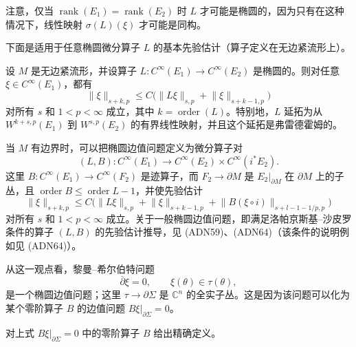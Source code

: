 注意，仅当 $\operatorname{rank}(E_1)=\operatorname{rank}(E_2)$ 时 $L$ 才可能是椭圆的，因为只有在这种情况下，线性映射 $\sigma(L)(\xi)$ 才可能是同构。

下面是适用于任意椭圆微分算子 $L$ 的基本先验估计（算子定义在无边紧流形上）。

\begin{proposition}\label{prop:elliptic-a-priori-estimate-fredholm}
设 $M$ 是无边紧流形，并设算子
$L:C^\infty(E_1)\to C^\infty(E_2)$ 是椭圆的。则对任意
$\xi\in C^\infty(E_1)$，都有
\[
 \lVert\xi\rVert_{s+k,p}\leq
 C\bigl(\lVert L\xi\rVert_{s,p}+\lVert\xi\rVert_{s+k-1,p}\bigr)
\]
对所有 $s$ 和 $1<p<\infty$ 成立，其中 $k=\operatorname{order}(L)$。特别地，$L$ 延拓为从 $W^{k+s,p}(E_1)$ 到 $W^{s,p}(E_2)$ 的有界线性映射，并且这个延拓是弗雷德霍姆的。
\end{proposition}

\begin{remark}\label{rem:elliptic-boundary-value-problem}
当 $M$ 有边界时，可以把椭圆边值问题定义为微分算子对
\[
 (L,B):C^\infty(E_1)\longrightarrow
 C^\infty(E_2)\times C^\infty(i^*E_2).
\]
这里 $B:C^\infty(E_1)\to C^\infty(F_2)$ 是迹算子，而
$F_2\to\partial M$ 是 $E_2|_{\partial M}$ 在 $\partial M$ 上的子丛，且
$\operatorname{order}B\leq\operatorname{order}L-1$，并使先验估计
\[
 \lVert\xi\rVert_{s+k,p}\leq C\bigl(
 \lVert L\xi\rVert_{s,p}+\lVert\xi\rVert_{s+k-1,p}
 +\lVert B(\xi\circ i)\rVert_{s+l-1-1/p,p}\bigr)
\]
对所有 $s$ 和 $1<p<\infty$ 成立。关于一般椭圆边值问题，即满足洛帕京斯基--沙皮罗条件的算子 $(L,B)$ 的先验估计推导，见 (ADN59)、(ADN64)（该条件的说明例如见 (ADN64)）。

从这一观点看，黎曼--希尔伯特问题
\[
 \overline\partial\xi=0,
 \qquad \xi(\theta)\in\tau(\theta),
\]
是一个椭圆边值问题；这里 $\tau\to\partial\Sigma$ 是 $\mathbb C^n$ 的全实子丛。这是因为该问题可以化为某个零阶算子 $B$ 的边值问题
$B\xi|_{\partial\Sigma}=0$。
\end{remark}

\begin{exercise}\label{ex:riemann-hilbert-zero-order-boundary-operator}
对上式 $B\xi|_{\partial\Sigma}=0$ 中的零阶算子 $B$ 给出精确定义。
\end{exercise}
